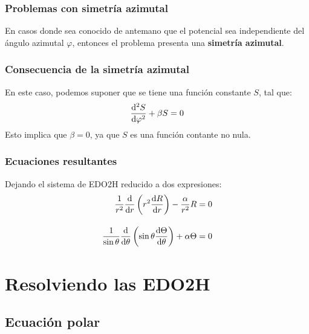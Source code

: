 \documentclass[12pt]{beamer}
\begin{document}
\begin{frame}
\frametitle{Problemas con simetría azimutal}
En casos donde sea conocido de antemano que el potencial sea independiente del ángulo azimutal $\varphi$, entonces el problema presenta una \textbf{simetría azimutal}.
\end{frame}
\begin{frame}
\frametitle{Consecuencia de la simetría azimutal}
En este caso, podemos suponer que se tiene una función constante $S$, tal que:
\begin{align*}
\dv[2]{S}{\varphi} + \beta S = 0
\end{align*}
\pause
Esto implica que $\beta = 0$, ya que $S$ es una función contante no nula.
\end{frame}
\begin{frame}
\frametitle{Ecuaciones resultantes}
Dejando el sistema de EDO2H reducido a dos expresiones:
\begin{align}
\begin{aligned}
\dfrac{1}{r^{2}} \dv{r} \left( r^{2} \dv{R}{r} \right) - \dfrac{\alpha}{r^{2}} R &= 0 \\[1em]
\dfrac{1}{\sin \theta} \dv{\theta} \left( \sin \theta \dv{\Theta}{\theta} \right) + \alpha \Theta &= 0
\end{aligned}
\label{eq:ecuacion_26_02}
\end{align}
\end{frame}

\section{Resolviendo las EDO2H}
\subsection{Ecuación polar}
\end{document}
